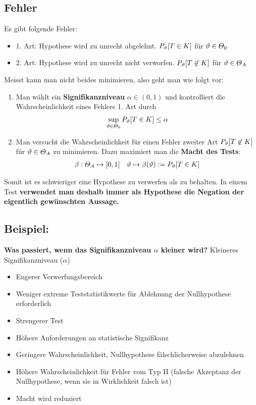 \subsection{Fehler}
Es gibt folgende Fehler:
\begin{itemize}
  \item 1. Art: Hypothese wird zu unrecht abgelehnt. $P_\vartheta[T \in K]$ für $\vartheta \in \varTheta_0$
  \item 2. Art: Hypothese wird zu unrecht nicht verworfen. $P_\vartheta[T \not \in K]$ für $\vartheta \in \varTheta_A$
\end{itemize}


Meisst kann man nicht beides minimieren, also geht man wie folgt vor:
\begin{enumerate}
  \item Man wählt ein \textbf{Signifikanzniveau} $\alpha \in (0, 1)$ und kontrolliert
        die Wahrscheinlichkeit eines Fehlers 1. Art durch
        \begin{align*}
          \sup_{\vartheta \in \varTheta_0} P_\vartheta[T \in K] \leq \alpha
        \end{align*}
  \item Man versucht die Wahrscheinlichkeit für einen Fehler zweiter Art $P_\vartheta[T \not
            \in K]$ für $\vartheta \in \varTheta_A$ zu minimieren. Dazu maximiert man die
        \textbf{Macht des Tests}:
        \begin{align*}
          \beta : \varTheta_A \mapsto [0, 1] &  & \vartheta \mapsto \beta (\vartheta) := P_\vartheta[T \in K]
        \end{align*}
\end{enumerate}
Somit ist es schwieriger eine Hypothese zu verwerfen als zu behalten. In einem
Test \textbf{verwendet man deshalb immer als Hypothese die Negation der eigentlich gewünschten Aussage.}
\BoxStart{}
\subsection{Beispiel:}
\textbf{Was passiert, wenn das Signifikanzniveau $\alpha$ kleiner wird?}
Kleineres Signifikanzniveau ($\alpha$)
\begin{itemize}
  \item Engerer Verwerfungsbereich
  \item Weniger extreme Teststatistikwerte für Ablehnung der Nullhypothese erforderlich
  \item Strengerer Test
  \item Höhere Anforderungen an statistische Signifikanz
  \item Geringere Wahrscheinlichkeit, Nullhypothese fälschlicherweise abzulehnen
  \item Höhere Wahrscheinlichkeit für Fehler vom Typ II (falsche Akzeptanz der Nullhypothese, wenn sie in Wirklichkeit falsch ist)
  \item Macht wird reduziert
\end{itemize}
\BoxEnd{}


